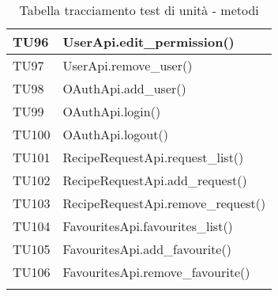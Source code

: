 \begin{center}
\begin{longtable}{| p{3cm} | p{9.5cm} |}
					\hline
					TU96 & UserApi.edit\_permission() \\
					\hline
					TU97 & UserApi.remove\_user() \\
					\hline
					TU98 & OAuthApi.add\_user() \\
					\hline
					TU99 & OAuthApi.login() \\
					\hline
					TU100 & OAuthApi.logout() \\
					\hline
					TU101 & RecipeRequestApi.request\_list() \\
					\hline
					TU102 & RecipeRequestApi.add\_request() \\
					\hline
					TU103 & RecipeRequestApi.remove\_request() \\
					\hline
					TU104 & FavouritesApi.favourites\_list() \\
					\hline
					TU105 & FavouritesApi.add\_favourite() \\
					\hline
					TU106 & FavouritesApi.remove\_favourite() \\
					\hline
			\caption{Tabella tracciamento test di unità - metodi}
			\end{longtable}
			\egroup
			\end{center}
			
	\pagebreak